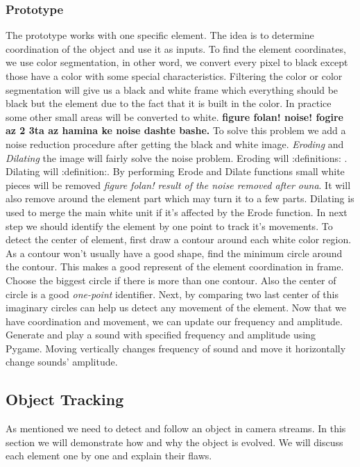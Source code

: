 \documentclass{report}
\begin{document}
\subsubsection{Prototype}
The prototype works with one specific element. The idea is to determine coordination of the object and use it as inputs. To find the element coordinates, we use color segmentation, in other word, we convert every pixel to black except those have a color with some special characteristics. Filtering the color or color segmentation will give us a black and white frame which everything should be black but the element due to the fact that it is built in the color. In practice some other small areas will be converted to white. \textbf{figure folan! noise! fogire az 2 3ta az hamina ke noise dashte bashe.} To solve this problem we add a noise reduction procedure after getting the black and white image. \textit{Eroding} and \textit{Dilating} the image will fairly solve the noise problem. Eroding will :definitions: . Dilating will :definition:. By performing Erode and Dilate functions small white pieces will be removed \textit{figure folan! result of the noise removed after ouna}. It will also remove around the element part which may turn it to a few parts. Dilating is used to merge the main white unit if it's affected by the Erode function. In next step we should identify the element by one point to track it's movements. To detect the center of element, first draw a contour around each white color region. As a contour won't usually have a good shape, find the minimum circle around the contour. This makes a good represent of the element coordination in frame. Choose the biggest circle if there is more than one contour. Also the center of circle is a good \textit{one-point} identifier. \newline
Next, by comparing two last center of this imaginary circles can help us detect any movement of the element. Now that we have coordination and movement, we can update our frequency and amplitude. Generate and play a sound with specified frequency and amplitude using Pygame. Moving vertically changes frequency of sound and move it horizontally change sounds' amplitude.  \newline

\subsection{Object Tracking}
As mentioned we need to detect and follow an object in camera streams. In this section we will demonstrate how and why the object is evolved. We will discuss each element one by one and explain their flaws.
\end{document}
